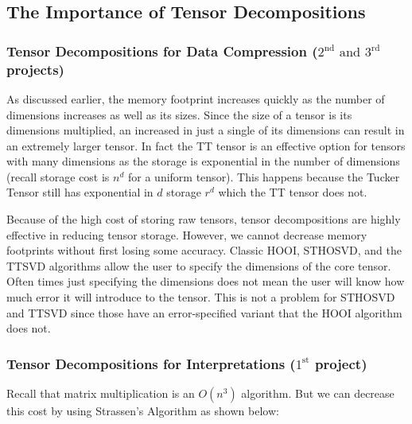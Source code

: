 \documentclass[MS]{wfuthesis}
\begin{document}
                

            \subsection{The Importance of Tensor Decompositions}
                \subsubsection{Tensor Decompositions for Data Compression ($2^\text{nd} \text{ and } 3^\text{rd}$ projects)}
                    As discussed earlier, the memory footprint increases quickly as the number of dimensions increases as well as its sizes. Since the size of a tensor is its dimensions multiplied, an increased in just a single of its dimensions can result in an extremely larger tensor. In fact the TT tensor is an effective option for tensors with many dimensions as the storage is exponential in the number of dimensions (recall storage cost is $n^d$ for a uniform tensor). This happens because the Tucker Tensor still has exponential in $d$ storage $r^d$ which the TT tensor does not.
                    
                    Because of the high cost of storing raw tensors, tensor decompositions are highly effective in reducing tensor storage. However, we cannot decrease memory footprints without first losing some accuracy. Classic HOOI, STHOSVD, and the TTSVD algorithms allow the user to specify the dimensions of the core tensor. Often times just specifying the dimensions does not mean the user will know how much error it will introduce to the tensor. This is not a problem for STHOSVD and TTSVD since those have an error-specified variant that the HOOI algorithm does not.

                \subsubsection{Tensor Decompositions for Interpretations ($1^\text{st}$ project)}
                    Recall that matrix multiplication is an $O(n^3)$ algorithm. But we can decrease this cost by using Strassen's Algorithm as shown below:
\end{document}
